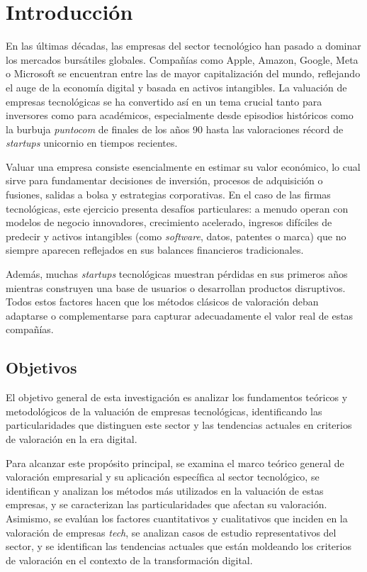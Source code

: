 \chapter{Introducción}

En las últimas décadas, las empresas del sector tecnológico han pasado a dominar los mercados bursátiles globales. Compañías como Apple, Amazon, Google, Meta o Microsoft se encuentran entre las de mayor capitalización del mundo, reflejando el auge de la economía digital y basada en activos intangibles. La valuación de empresas tecnológicas se ha convertido así en un tema crucial tanto para inversores como para académicos, especialmente desde episodios históricos como la burbuja \emph{puntocom} de finales de los años 90 hasta las valoraciones récord de \emph{startups} unicornio en tiempos recientes.

Valuar una empresa consiste esencialmente en estimar su valor económico, lo cual sirve para fundamentar decisiones de inversión, procesos de adquisición o fusiones, salidas a bolsa y estrategias corporativas. En el caso de las firmas tecnológicas, este ejercicio presenta desafíos particulares: a menudo operan con modelos de negocio innovadores, crecimiento acelerado, ingresos difíciles de predecir y activos intangibles (como \emph{software}, datos, patentes o marca) que no siempre aparecen reflejados en sus balances financieros tradicionales.

Además, muchas \emph{startups} tecnológicas muestran pérdidas en sus primeros años mientras construyen una base de usuarios o desarrollan productos disruptivos. Todos estos factores hacen que los métodos clásicos de valoración deban adaptarse o complementarse para capturar adecuadamente el valor real de estas compañías.

\section{Objetivos}

El objetivo general de esta investigación es analizar los fundamentos teóricos y metodológicos de la valuación de empresas tecnológicas, identificando las particularidades que distinguen este sector y las tendencias actuales en criterios de valoración en la era digital.

Para alcanzar este propósito principal, se examina el marco teórico general de valoración empresarial y su aplicación específica al sector tecnológico, se identifican y analizan los métodos más utilizados en la valuación de estas empresas, y se caracterizan las particularidades que afectan su valoración. Asimismo, se evalúan los factores cuantitativos y cualitativos que inciden en la valoración de empresas \emph{tech}, se analizan casos de estudio representativos del sector, y se identifican las tendencias actuales que están moldeando los criterios de valoración en el contexto de la transformación digital.

